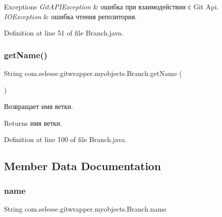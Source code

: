 \begin{DoxyExceptions}{Exceptions}
{\em Git\+A\+P\+I\+Exception} & ошибка при взаимодействии с Git Api. \\
\hline
{\em I\+O\+Exception} & ошибка чтения репозитория. \\
\hline
\end{DoxyExceptions}


Definition at line 51 of file Branch.\+java.

\mbox{\label{classcom_1_1selesse_1_1gitwrapper_1_1myobjects_1_1_branch_abfed85fe8f4604fc77cdb184e176db2c}} 
\subsubsection{\texorpdfstring{get\+Name()}{getName()}}
{\footnotesize\ttfamily String com.\+selesse.\+gitwrapper.\+myobjects.\+Branch.\+get\+Name (\begin{DoxyParamCaption}{ }\end{DoxyParamCaption})}

Возвращает имя ветки.

\begin{DoxyReturn}{Returns}
имя ветки. 
\end{DoxyReturn}


Definition at line 100 of file Branch.\+java.



\subsection{Member Data Documentation}
\mbox{\label{classcom_1_1selesse_1_1gitwrapper_1_1myobjects_1_1_branch_a9ec52c3aeb9e0f61a6bbc702285be865}} 
\subsubsection{\texorpdfstring{name}{name}}
{\footnotesize\ttfamily String com.\+selesse.\+gitwrapper.\+myobjects.\+Branch.\+name\hspace{0.3cm}{\ttfamily [private]}}



